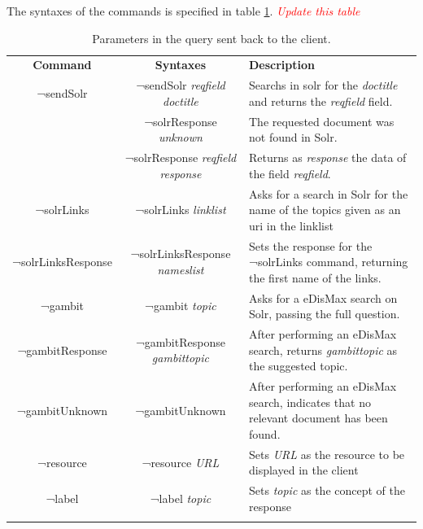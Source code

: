 The syntaxes of the commands is specified in table \ref{tab:gsi-commands}. \emph{\textcolor{red}{Update this table}}
\begin{center}
  \centering
  \begin{table}
    \begin{tabular*}{0.7\textwidth}{@{\extracolsep{\fill}} | c | c | p{} |}
      \hhline{|-|-|-|}
      \textbf{Command} & \textbf{Syntaxes} & \textbf{Description} \\ \hhline{|=|=|=|}
      ¬sendSolr & ¬sendSolr \textit{reqfield} \textit{doctitle} & Searchs in solr for the \textit{doctitle} and returns the \textit{reqfield} field.  \\ \hhline{|-|-|-|}
      \multirow{2}{*}{¬solrResponse} & ¬solrResponse \textit{unknown} & The requested document was not found in Solr. \\ \cline{2-3}
				     & ¬solrResponse \textit{reqfield} \textit{response} & Returns as \textit{response} the data of the field \textit{reqfield}. \\ \hhline{|-|-|-|}
      ¬solrLinks & ¬solrLinks \textit{linklist} & Asks for a search in Solr for the name of the topics given as an uri in the linklist \\ \hhline{|-|-|-|}
      ¬solrLinksResponse & ¬solrLinksResponse \textit{nameslist} & Sets the response for the ¬solrLinks command, returning the first name of the links. \\ \hhline{|-|-|-|}
      ¬gambit & ¬gambit \textit{topic}& Asks for a \ac{eDisMax} search on Solr, passing the full question. \\ \hhline{|-|-|-|}
      ¬gambitResponse & ¬gambitResponse \textit{gambittopic} & After performing an \ac{eDisMax} search, returns \textit{gambittopic} as the suggested topic. \\ \hhline{|-|-|-|}
      ¬gambitUnknown & ¬gambitUnknown & After performing an \ac{eDisMax} search, indicates that no relevant document has been found. \\ \hhline{|-|-|-|}
      ¬resource & ¬resource \textit{URL} & Sets \textit{URL} as the resource to be displayed in the client \\ \hhline{|-|-|-|}
      ¬label & ¬label \textit{topic} & Sets \textit{topic} as the concept of the response \\ \hhline{|-|-|-|}
      \end{tabular*}
    \caption{Parameters in the query sent back to the client.}
    \label{tab:gsi-commands}
  \end{table}
\end{center}


